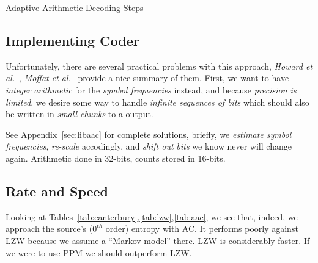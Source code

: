 \documentclass[a4paper, twocolumn]{article}
\begin{document}
        \newpage

        \begin{algorithm}
            \begin{algorithmic}
                \ENDWHILE
            \end{algorithmic}
            \caption{Adaptive Arithmetic Decoding Steps}
            \label{alg:aacx}
        \end{algorithm}

        \vspace{-0.2in}
        \subsection{Implementing Coder} \label{sec:aac_implementing_coder}

        Unfortunately, there are several practical problems with this approach, \emph{Howard et al.}~\cite{howard1992practical}, \emph{Moffat et al.}~\cite{moffat1998arithmetic} provide a nice summary of them. First, we want to have \emph{integer arithmetic} for the \emph{symbol frequencies} instead, and because \emph{precision is limited}, we desire some way to handle \emph{infinite sequences of bits} which should also be written in \emph{small chunks} to a output.

        See Appendix~\ref{sec:libaac} for complete solutions, briefly, we \emph{estimate symbol frequencies}, \emph{re-scale} accodingly, and \emph{shift out bits} we know never will change again. Arithmetic done in 32-bits, counts stored in 16-bits.

        \vspace{-0.146in}
        \subsection{Rate and Speed} \label{sec:aac_rate_and_speed}

        Looking at Tables~\ref{tab:canterbury},\ref{tab:lzw},\ref{tab:aac}, we see that, indeed, we approach the source's (\(0^{th}\) order) entropy with AC. It performs poorly against LZW because we assume a ``Markov model'' there. LZW is considerably faster. If we were to use PPM we should outperform LZW.
\end{document}

